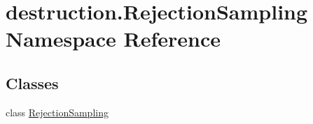 \hypertarget{namespacedestruction_1_1_rejection_sampling}{\section{destruction.\-Rejection\-Sampling Namespace Reference}
\label{namespacedestruction_1_1_rejection_sampling}
}
\subsection*{Classes}
\begin{DoxyCompactItemize}
\item 
class \hyperlink{classdestruction_1_1_rejection_sampling_1_1_rejection_sampling}{Rejection\-Sampling}
\end{DoxyCompactItemize}
